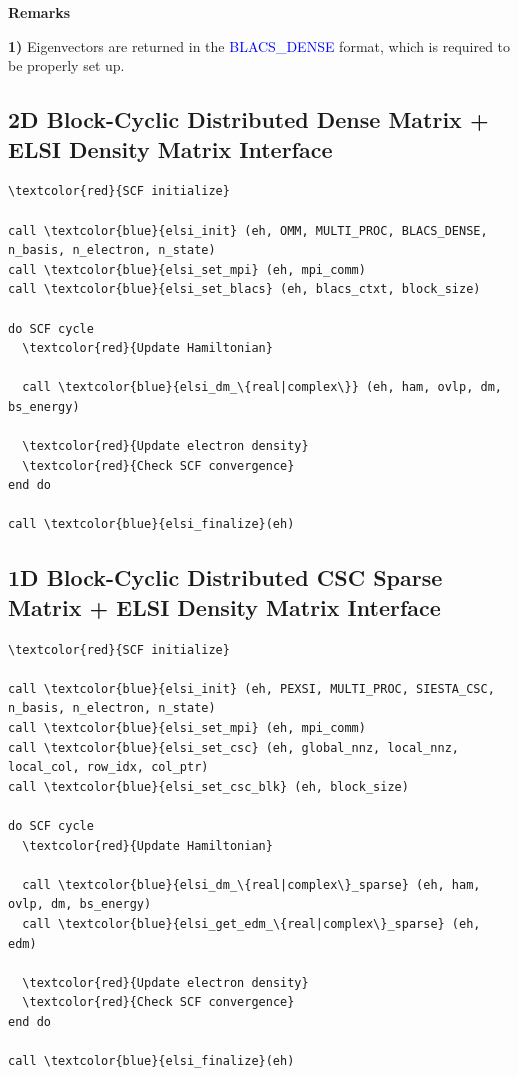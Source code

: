 \documentclass{report}
\begin{document}
\textbf{Remarks}

\textbf{1)} Eigenvectors are returned in the \textcolor{blue}{BLACS\_DENSE} format, which is required to be properly set up.

\subsection*{2D Block-Cyclic Distributed Dense Matrix + ELSI Density Matrix Interface}
\begin{tcolorbox}
\begin{Verbatim}[commandchars=\\\{\}]
\textcolor{red}{SCF initialize}

call \textcolor{blue}{elsi_init} (eh, OMM, MULTI_PROC, BLACS_DENSE, n_basis, n_electron, n_state)
call \textcolor{blue}{elsi_set_mpi} (eh, mpi_comm)
call \textcolor{blue}{elsi_set_blacs} (eh, blacs_ctxt, block_size)

do SCF cycle
  \textcolor{red}{Update Hamiltonian}

  call \textcolor{blue}{elsi_dm_\{real|complex\}} (eh, ham, ovlp, dm, bs_energy)

  \textcolor{red}{Update electron density}
  \textcolor{red}{Check SCF convergence}
end do

call \textcolor{blue}{elsi_finalize}(eh)
\end{Verbatim}
\end{tcolorbox}

\subsection*{1D Block-Cyclic Distributed CSC Sparse Matrix + ELSI Density Matrix Interface}
\begin{tcolorbox}
\begin{Verbatim}[commandchars=\\\{\}]
\textcolor{red}{SCF initialize}

call \textcolor{blue}{elsi_init} (eh, PEXSI, MULTI_PROC, SIESTA_CSC, n_basis, n_electron, n_state)
call \textcolor{blue}{elsi_set_mpi} (eh, mpi_comm)
call \textcolor{blue}{elsi_set_csc} (eh, global_nnz, local_nnz, local_col, row_idx, col_ptr)
call \textcolor{blue}{elsi_set_csc_blk} (eh, block_size)

do SCF cycle
  \textcolor{red}{Update Hamiltonian}

  call \textcolor{blue}{elsi_dm_\{real|complex\}_sparse} (eh, ham, ovlp, dm, bs_energy)
  call \textcolor{blue}{elsi_get_edm_\{real|complex\}_sparse} (eh, edm)

  \textcolor{red}{Update electron density}
  \textcolor{red}{Check SCF convergence}
end do

call \textcolor{blue}{elsi_finalize}(eh)
\end{Verbatim}
\end{tcolorbox}
\end{document}
